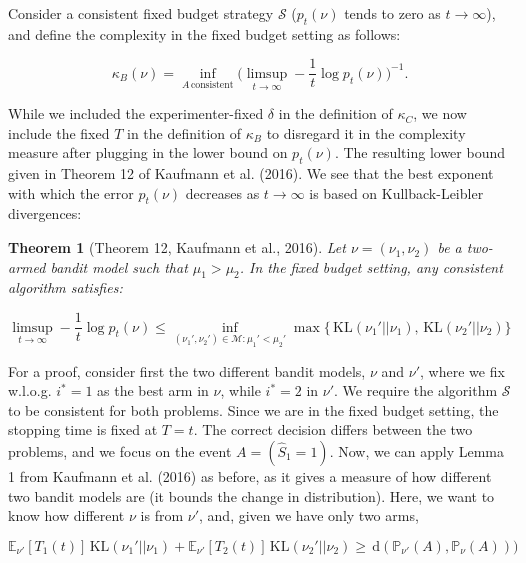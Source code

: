 \documentclass[11pt,]{article}
\newtheorem{theorem}{Theorem}
\newcommand{\KL}{\,\text{KL}}
\newcommand{\der}{\,\text{d}}
\begin{document}
Consider a consistent fixed budget strategy \(\mathcal{S}\)
(\(p_t(\nu)\) tends to zero as \(t \rightarrow \infty\)), and define the
complexity in the fixed budget setting as follows:

\begin{equation}
\kappa_B(\nu) = \inf_{A \, \text{consistent}} \Big(\limsup_{t \to \infty} - \frac{1}{t} \log p_t(\nu)\Big)^{-1}.
\end{equation}

While we included the experimenter-fixed \(\delta\) in the definition of
\(\kappa_C\), we now include the fixed \(T\) in the definition of
\(\kappa_B\) to disregard it in the complexity measure after plugging in
the lower bound on \(p_t(\nu)\). The resulting lower bound given in
Theorem 12 of Kaufmann et al. (2016). We see that the best exponent with
which the error \(p_t(\nu)\) decreases as \(t \rightarrow \infty\) is
based on Kullback-Leibler divergences:

\begin{theorem}[Theorem 12, Kaufmann et al., 2016] \label{theorem:KaufmannEtAlTheorem12}
Let $\nu = (\nu_1, \nu_2)$ be a two-armed bandit model such that $\mu_1 > \mu_2$. In the fixed budget setting, any consistent algorithm satisfies:

\begin{equation*}
\limsup_{t \to \infty} - \frac{1}{t} \log p_t(\nu) \leq \inf_{(\nu_1', \nu_2') \in \mathcal{M}: \mu_1' < \mu_2'} \max \big\{\KL(\nu_1' || \nu_1), \KL(\nu_2' || \nu_2)\big\}
\end{equation*}
\end{theorem}

For a proof, consider first the two different bandit models, \(\nu\) and
\(\nu'\), where we fix w.l.o.g. \(i^* = 1\) as the best arm in \(\nu\),
while \(i^* = 2\) in \(\nu'\). We require the algorithm \(\mathcal{S}\)
to be consistent for both problems. Since we are in the fixed budget
setting, the stopping time is fixed at \(T = t\). The correct decision
differs between the two problems, and we focus on the event
\(A = (\hat{S}_1 = 1)\). Now, we can apply Lemma 1 from Kaufmann et al.
(2016) as before, as it gives a measure of how different two bandit
models are (it bounds the change in distribution). Here, we want to know
how different \(\nu\) is from \(\nu'\), and, given we have only two
arms,

\begin{equation*}
\mathbb{E}_{\nu'}[T_1(t)]\KL(\nu_1'|| \nu_1) + \mathbb{E}_{\nu'}[T_2(t)]\KL(\nu_2'|| \nu_2) \geq \der(\mathbb{P}_{\nu'}(A),\mathbb{P}_{\nu}(A)))
\end{equation*}
\end{document}
